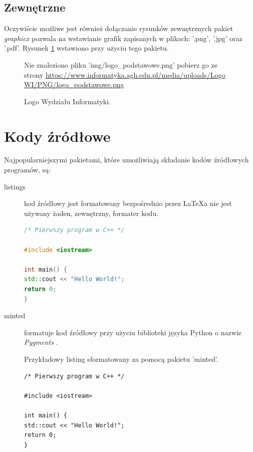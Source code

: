 \documentclass{agh-wi} %
\begin{document}
\subsection{Zewnętrzne}
Oczywiście możliwe jest również dołączanie rysunków zewnętrznych \pauza
pakiet \emph{graphicx} \cite{graphicx} pozwala na wstawianie grafik zapisanych w  plikach: '.png', '.jpg' oraz '.pdf'. Rysunek \ref{fig:logo} wstawiono przy użyciu tego pakietu.
\begin{figure}[!ht]
    \begin{center}
        {Nie znaleziono pliku 'img/logo\_podstawowe.png' \pauza pobierz go ze strony \url{https://www.informatyka.agh.edu.pl/media/uploads/Logo WI/PNG/logo_podstawowe.png}}
    \end{center}
    \caption{Logo Wydziału Informatyki.}
    \label{fig:logo}
\end{figure}
\section{Kody źródłowe}
Najpopularniejszymi pakietami, które umożliwiają składanie kodów źródłowych programów, są:
\begin{description}
    \item[listings \cite{listings}] \pauza kod źródłowy jest formatowany bezpośrednio przez \LaTeX{}\dywiz{}a \pauza nie jest używany żaden, zewnętrzny, formater kodu.
        \begin{lstlisting}[language=C++, float=ht, label=lst:code1, caption={Przykładowy kod źródłowy sformatowany za pomocą pakietu 'listings'.}]
/* Pierwszy program w C++ */

#include <iostream>

int main() {
std::cout << "Hello World!";
return 0;
}
\end{lstlisting}
    \item[minted \cite{minted}] \pauza formatuje kod źródłowy przy użyciu biblioteki języka Python  o nazwie \emph{Pygments} \cite{pygments}.
        \begin{listing}[!ht]
            \caption{Przykładowy listing sformatowany za pomocą pakietu 'minted'.\label{lst:code2}}
            \begin{verbatim}
/* Pierwszy program w C++ */

#include <iostream>

int main() {
std::cout << "Hello World!";
return 0;
}
\end{verbatim}
        \end{listing}
\end{description}
\end{document}
